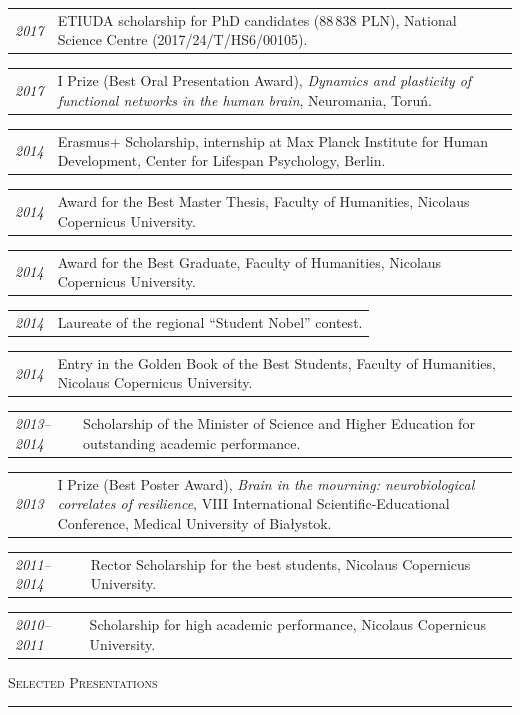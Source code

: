 \documentclass[10pt, a4paper]{article}
\makeatletter
\newcommand{\cvsection}[1]{%
  \vspace{1.4em}%
  {\large\scshape #1}%
  \vspace{0.25em}%
  \par\noindent\textcolor{rule}{\rule{\linewidth}{0.4pt}}%
  \vspace{0.5em}%
}
\newcommand{\cventry}[2]{%
  \begin{tabular*}{\linewidth}{@{}p{2.8cm}@{\hspace{0.5em}}p{\dimexpr\linewidth-3.3cm}@{}}
    \textcolor{accent}{\small\itshape #1} & #2 \\[0.2em]
  \end{tabular*}%
}
\makeatother
\begin{document}
\cventry{2017}{ETIUDA scholarship for PhD candidates (88\,838 PLN), National Science Centre (2017/24/T/HS6/00105).}

\cventry{2017}{I Prize (Best Oral Presentation Award), \textit{Dynamics and plasticity of functional networks in the human brain}, Neuromania, Toru\'n.}

\cventry{2014}{Erasmus+ Scholarship, internship at Max Planck Institute for Human Development, Center for Lifespan Psychology, Berlin.}

\cventry{2014}{Award for the Best Master Thesis, Faculty of Humanities, Nicolaus Copernicus University.}

\cventry{2014}{Award for the Best Graduate, Faculty of Humanities, Nicolaus Copernicus University.}

\cventry{2014}{Laureate of the regional ``Student Nobel'' contest.}

\cventry{2014}{Entry in the Golden Book of the Best Students, Faculty of Humanities, Nicolaus Copernicus University.}

\cventry{2013--2014}{Scholarship of the Minister of Science and Higher Education for outstanding academic performance.}

\cventry{2013}{I Prize (Best Poster Award), \textit{Brain in the mourning: neurobiological correlates of resilience}, VIII International Scientific-Educational Conference, Medical University of Bia{\l}ystok.}

\cventry{2011--2014}{Rector Scholarship for the best students, Nicolaus Copernicus University.}

\cventry{2010--2011}{Scholarship for high academic performance, Nicolaus Copernicus University.}

\cvsection{Selected Presentations}
\end{document}
